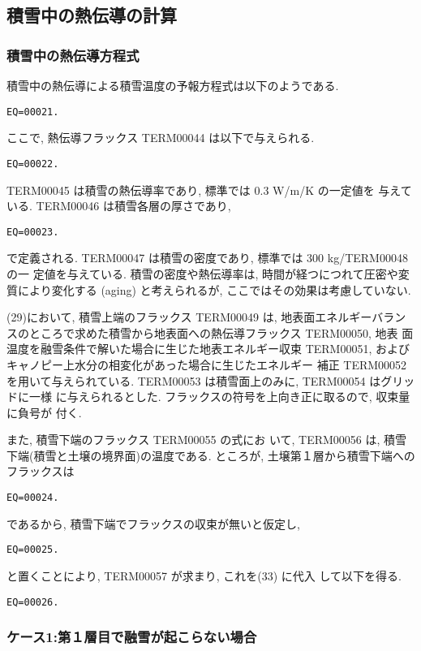 \subsection{積雪中の熱伝導の計算}

\subsubsection{積雪中の熱伝導方程式}

積雪中の熱伝導による積雪温度の予報方程式は以下のようである.
\begin{verbatim}
EQ=00021.
\end{verbatim}

ここで, 熱伝導フラックス TERM00044 は以下で与えられる.
\begin{verbatim}
EQ=00022.
\end{verbatim}
TERM00045 は積雪の熱伝導率であり, 標準では 0.3 W/m/K の一定値を
与えている. TERM00046 は積雪各層の厚さであり,
\begin{verbatim}
EQ=00023.
\end{verbatim}
で定義される. TERM00047 は積雪の密度であり, 標準では 300 kg/TERM00048 の一
定値を与えている.
積雪の密度や熱伝導率は, 時間が経つにつれて圧密や変質により変化する
(aging) と考えられるが, ここではその効果は考慮していない.

(29)において,
積雪上端のフラックス TERM00049 は, 地表面エネルギーバラン
スのところで求めた積雪から地表面への熱伝導フラックス TERM00050, 地表
面温度を融雪条件で解いた場合に生じた地表エネルギー収束 TERM00051, およびキャノピー上水分の相変化があった場合に生じたエネルギー
補正 TERM00052 を用いて与えられている.
TERM00053 は積雪面上のみに, TERM00054 はグリッドに一様
に与えられるとした. フラックスの符号を上向き正に取るので, 収束量に負号が
付く.

また, 積雪下端のフラックス TERM00055 の式にお
いて, TERM00056 は, 積雪下端(積雪と土壌の境界面)の温度である.
ところが, 土壌第１層から積雪下端へのフラックスは
\begin{verbatim}
EQ=00024.
\end{verbatim}
であるから, 積雪下端でフラックスの収束が無いと仮定し,
\begin{verbatim}
EQ=00025.
\end{verbatim}
と置くことにより, TERM00057 が求まり, これを(33) に代入
して以下を得る.
\begin{verbatim}
EQ=00026.
\end{verbatim}

\subsubsection{ケース1:第１層目で融雪が起こらない場合}

